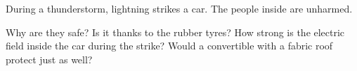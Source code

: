 During a thunderstorm, lightning strikes a car. The people inside are unharmed.

\begin{abcliste}
\abc Why are they safe? Is it thanks to the rubber tyres?
\abc How strong is the electric field inside the car during the strike?
\abc Would a convertible with a fabric roof protect just as well?
\end{abcliste}
